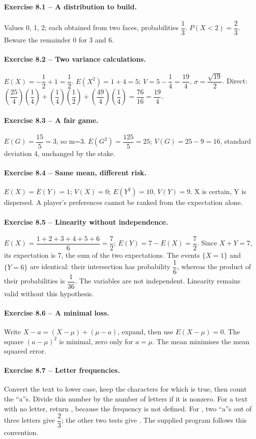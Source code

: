 \paragraph{Exercise 8.1 -- A distribution to build.} Values 0, 1, 2; each obtained from two faces, probabilities $\dfrac{1}{3}$. $P(X<2)=\dfrac{2}{3}$. Beware the remainder 0 for 3 and 6.
\paragraph{Exercise 8.2 -- Two variance calculations.} $E(X)=-\dfrac{1}{2}+1=\dfrac{1}{2}$. $E(X^2)=1+4=5$; $V=5-\dfrac{1}{4}=\dfrac{19}{4}$, $\sigma =\dfrac{\sqrt {19}}{2}$. Direct: $(\dfrac{25}{4})(\dfrac{1}{4})+(\dfrac{1}{4})(\dfrac{1}{2})+(\dfrac{49}{4})(\dfrac{1}{4})=\dfrac{76}{16}=\dfrac{19}{4}$.
\paragraph{Exercise 8.3 -- A fair game.} $E(G)=\dfrac{15}{5}=3$, so m=3. $E(G^2)=\dfrac{125}{5}=25$; $V(G)=25-9=16$, standard deviation 4, unchanged by the stake.
\paragraph{Exercise 8.4 -- Same mean, different risk.} $E(X)=E(Y)=1$; $V(X)=0$; $E(Y^2)=10$, $V(Y)=9$. X is certain, Y is dispersed. A player's preferences cannot be ranked from the expectation alone.
\paragraph{Exercise 8.5 -- Linearity without independence.} $E(X)=\dfrac{1+2+3+4+5+6}{6}=\dfrac72$; $E(Y)=7-E(X)=\dfrac72$. Since $X+Y=7$, its expectation is 7, the sum of the two expectations. The events $\{X=1\}$ and $\{Y=6\}$ are identical: their intersection has probability $\dfrac16$, whereas the product of their probabilities is $\dfrac1{36}$. The variables are not independent. Linearity remains valid without this hypothesis.
\paragraph{Exercise 8.6 -- A minimal loss.} Write $X-a=(X-\mu)+(\mu-a)$, expand, then use $E(X-\mu)=0$. The square $(a-\mu)^2$ is minimal, zero only for $a=\mu$. The mean minimises the mean squared error.
\paragraph{Exercise 8.7 -- Letter frequencies.} Convert the text to lower case, keep the characters for which  is true, then count the ``a''s. Divide this number by the number of letters if it is nonzero. For a text with no letter, return , because the frequency is not defined. For , two ``a''s out of three letters give $\dfrac23$; the other two tests give . The supplied program  follows this convention.
